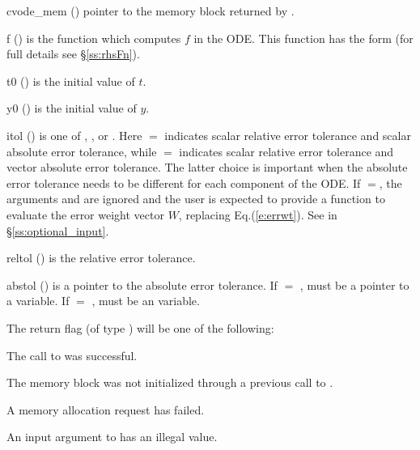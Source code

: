 {
  \begin{args}
  \item[cvode\_mem] ()
    pointer to the {\cvode} memory block returned by .
  \item[f] ()
    is the {\C} function which computes $f$ in the ODE. This function has the 
    form  (for full details see \S\ref{ss:rhsFn}).
  \item[t0] ()
    is the initial value of $t$.
  \item[y0] ()
    is the initial value of $y$. 
  \item[itol] () 
    is one of , , or . Here  $=$ 
    indicates scalar relative error tolerance and scalar absolute error tolerance,
    while  $=$  indicates scalar relative error tolerance and
    vector absolute error tolerance.  The latter choice is important when the
    absolute error tolerance needs to be different for each component of the ODE. 
    If $=$, the arguments  and  are
    ignored and the user is expected to provide a function to evaluate the error
    weight vector $W$, replacing Eq.(\ref{e:errwt}). See  in
    \S\ref{ss:optional_input}.
  \item[reltol] ()
    is the relative error tolerance.
  \item[abstol] ()
    is a pointer to the absolute error tolerance. If  $=$ ,
     must be a pointer to a  variable. If
     $=$ ,  must be an  variable.
  \end{args}
}
{
  The return flag  (of type ) will be one of the following:
  \begin{args}
  \item[\Id{CV\_SUCCESS}]
    The call to  was successful.
  \item[\Id{CV\_MEM\_NULL}] 
    The {\cvode} memory block was not initialized through a previous call
    to .
  \item[\Id{CV\_MEM\_FAIL}] 
    A memory allocation request has failed.
  \item[\Id{CV\_ILL\_INPUT}] 
    An input argument to  has an illegal value.
  \end{args}
}
